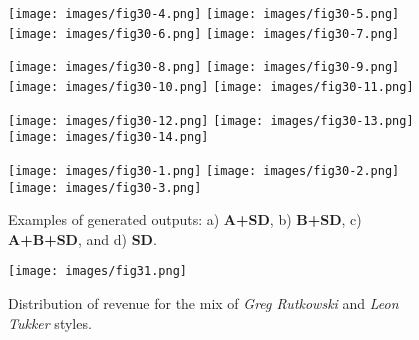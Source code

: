 \documentclass[12pt, letterpaper]{article}
\begin{document}
\begin{figure}[h]
    \centering
    \begin{minipage}{\textwidth}
        \centering
        \texttt{[image: images/fig30-4.png]}
        \texttt{[image: images/fig30-5.png]}
        \texttt{[image: images/fig30-6.png]}
        \texttt{[image: images/fig30-7.png]}
        \label{fig30:row_a}
    \end{minipage}
    \begin{minipage}{\textwidth}
        \centering
        \texttt{[image: images/fig30-8.png]}
        \texttt{[image: images/fig30-9.png]}
        \texttt{[image: images/fig30-10.png]}
        \texttt{[image: images/fig30-11.png]}
        \label{fig30:row_b}
    \end{minipage}
    \begin{minipage}{\textwidth}
        \centering
        \texttt{[image: images/fig30-12.png]}
        \texttt{[image: images/fig30-13.png]}
        \texttt{[image: images/fig30-14.png]}
        \label{fig30:row_c}
    \end{minipage}
    \begin{minipage}{\textwidth}
        \centering
        \texttt{[image: images/fig30-1.png]}
        \texttt{[image: images/fig30-2.png]}
        \texttt{[image: images/fig30-3.png]}
        \label{fig30:row_d}
    \end{minipage}
    \caption{Examples of generated outputs: a) \textbf{A+SD}, b) \textbf{B+SD}, c) \textbf{A+B+SD}, and d) \textbf{SD}.}
    \label{fig30:all_images}
\end{figure}

\begin{figure}[h]
    \centering
    \texttt{[image: images/fig31.png]}
    \caption{Distribution of revenue for the mix of \textit{Greg Rutkowski} and \textit{Leon Tukker} styles.}
    \label{fig31:image1}
\end{figure}
\end{document}
